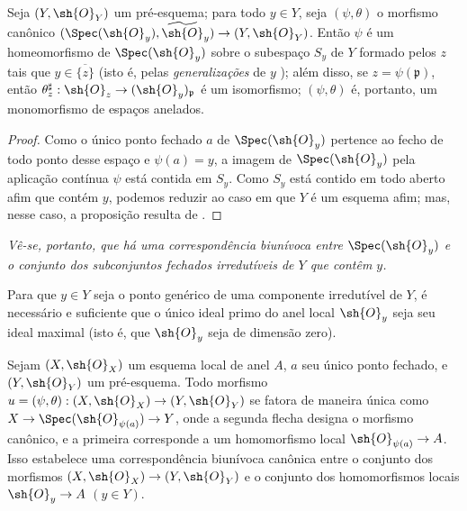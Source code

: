 \documentclass[oneside]{amsart}
\makeatletter
\newcommand{\ega@arrow}[2]{\mathchoice{#1}{#2}{#2}{#2}}
\renewcommand{\to}{\ega@arrow{\longrightarrow}{\rightarrow}}
\newcommand{\oldpage}[2][]{{\marginnote{\normalfont\textbf{#1}~|~#2}}\ignorespaces}
\let\EGAOriginalLabel\label
\renewcommand{\label}[1]{\phantomsection\EGAOriginalLabel{#1}}
\makeatother
\begin{document}
\begin{proposition}[2.4.2]
\label{I.2.4.2}
\oldpage[I]{102}
Seja $(Y,\sh{O}_Y)$ um pré-esquema; para todo $y\in Y$, seja
$(\psi,\theta)$ o morfismo canônico
$(\Spec(\sh{O}_y),\widetilde{\sh{O}}_y)\to(Y,\sh{O}_Y)$. Então $\psi$ é
um homeomorfismo de $\Spec(\sh{O}_y)$ sobre o subespaço $S_y$ de $Y$
formado pelos $z$ tais que $y\in\overline{\{z\}}$ (isto é, pelas
\emph{generalizações} de $y$ ); além disso, se
$z=\psi(\mathfrak{p})$, então
$\theta_z^{\sharp}:\sh{O}_z\to(\sh{O}_y)_{\mathfrak{p}}$ é um
isomorfismo; $(\psi,\theta)$ é, portanto, um monomorfismo de espaços
anelados.
\end{proposition}

\begin{proof}
Como o único ponto fechado $a$ de $\Spec(\sh{O}_y)$ pertence ao fecho de
todo ponto desse espaço e $\psi(a)=y$, a imagem de
$\Spec(\sh{O}_y)$ pela aplicação contínua $\psi$ está contida em $S_y$.
Como $S_y$ está contido em todo aberto afim que contém $y$, podemos
reduzir ao caso em que $Y$ é um esquema afim; mas, nesse caso, a
proposição resulta de .
\end{proof}

\emph{Vê-se, portanto,  que há uma correspondência
biunívoca entre $\Spec(\sh{O}_y)$ e o conjunto dos subconjuntos fechados
irredutíveis de $Y$ que contêm $y$.}

\begin{corollary}[2.4.3]
\label{I.2.4.3}
Para que $y\in Y$ seja o ponto genérico de uma componente irredutível de
$Y$, é necessário e suficiente que o único ideal primo do anel local
$\sh{O}_y$ seja seu ideal maximal (isto é, que $\sh{O}_y$ seja de
dimensão zero).
\end{corollary}

\begin{proposition}[2.4.4]
\label{I.2.4.4}
Sejam $(X,\sh{O}_X)$ um esquema local de anel $A$, $a$ seu único ponto
fechado, e $(Y,\sh{O}_Y)$ um pré-esquema. Todo morfismo
$u=(\psi,\theta):(X,\sh{O}_X)\to(Y,\sh{O}_Y)$ se fatora de maneira única
como
$X\to\Spec(\sh{O}_{\psi(a)})\to Y$, onde a segunda flecha designa o
morfismo canônico, e a primeira corresponde a um homomorfismo local
$\sh{O}_{\psi(a)}\to A$. Isso estabelece uma correspondência biunívoca
canônica entre o conjunto dos morfismos
$(X,\sh{O}_X)\to(Y,\sh{O}_Y)$ e o conjunto dos homomorfismos locais
$\sh{O}_y\to A$ $(y\in Y)$.
\end{proposition}
\end{document}
